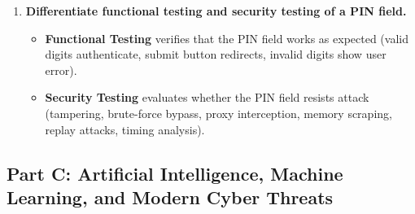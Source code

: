 \begin{enumerate}[label=\textbf{Q\arabic*.,resume},leftmargin=1.2cm]
\item \textbf{Differentiate functional testing and security testing of a PIN field.}
\begin{itemize}
\item \textbf{Functional Testing} verifies that the PIN field works as expected (valid digits authenticate, submit button redirects, invalid digits show user error).
\item \textbf{Security Testing} evaluates whether the PIN field resists attack (tampering, brute-force bypass, proxy interception, memory scraping, replay attacks, timing analysis).
\end{itemize}
\end{enumerate}

\subsection{Part C: Artificial Intelligence, Machine Learning, and Modern Cyber Threats}


